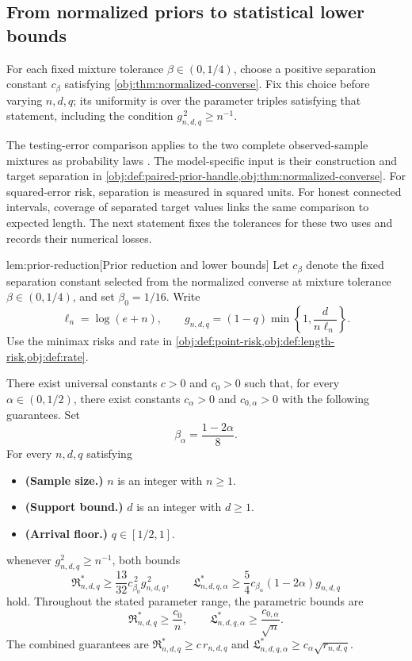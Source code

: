 \subsection{From normalized priors to statistical lower bounds}

For each fixed mixture tolerance \(\beta\in(0,1/4)\), choose a positive separation constant \(c_\beta\) satisfying \cref{obj:thm:normalized-converse}. Fix this choice before varying \(n,d,q\); its uniformity is over the parameter triples satisfying that statement, including the condition \(g_{n,d,q}^{\,2}\ge n^{-1}\).

The testing-error comparison applies to the two complete observed-sample mixtures as probability laws \citep[Theorem~2.2]{Tsybakov2009}. The model-specific input is their construction and target separation in \cref{obj:def:paired-prior-handle,obj:thm:normalized-converse}. For squared-error risk, separation is measured in squared units. For honest connected intervals, coverage of separated target values links the same comparison to expected length. The next statement fixes the tolerances for these two uses and records their numerical losses.

\begin{lemmav}{lem:prior-reduction}[Prior reduction and lower bounds]
Let \(c_\beta\) denote the fixed separation constant selected from the normalized converse at mixture tolerance \(\beta\in(0,1/4)\), and set \(\beta_0=1/16\). Write
\[
\ell_n=\log(e+n),
\qquad
g_{n,d,q}=(1-q)\min\left\{1,\frac{d}{n\ell_n}\right\}.
\]
Use the minimax risks and rate in \cref{obj:def:point-risk,obj:def:length-risk,obj:def:rate}.

There exist universal constants \(c>0\) and \(c_0>0\) such that, for every \(\alpha\in(0,1/2)\), there exist constants \(c_\alpha>0\) and \(c_{0,\alpha}>0\) with the following guarantees. Set
\[
\beta_\alpha=\frac{1-2\alpha}{8}.
\]
For every \(n,d,q\) satisfying
\begin{itemize}
\item \textbf{(Sample size.)} \(n\) is an integer with \(n\ge1\).
\item \textbf{(Support bound.)} \(d\) is an integer with \(d\ge1\).
\item \textbf{(Arrival floor.)} \(q\in[1/2,1]\).
\end{itemize}
whenever \(g_{n,d,q}^2\ge n^{-1}\), both bounds
\[
\mathfrak R^*_{n,d,q}
\ge \frac{13}{32}c_{\beta_0}^{\,2}g_{n,d,q}^{\,2},
\qquad
\mathfrak L^*_{n,d,q,\alpha}
\ge \frac54 c_{\beta_\alpha}(1-2\alpha)g_{n,d,q}
\]
hold. Throughout the stated parameter range, the parametric bounds are
\[
\mathfrak R^*_{n,d,q}\ge\frac{c_0}{n},
\qquad
\mathfrak L^*_{n,d,q,\alpha}\ge\frac{c_{0,\alpha}}{\sqrt n}.
\]
The combined guarantees are
\(\mathfrak R^*_{n,d,q}\ge c\,r_{n,d,q}\) and
\(\mathfrak L^*_{n,d,q,\alpha}\ge c_\alpha\sqrt{r_{n,d,q}}\).
\end{lemmav}

